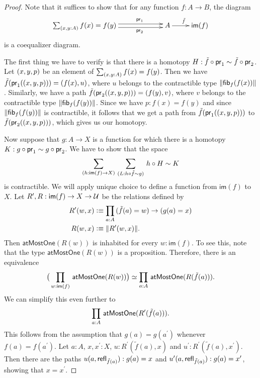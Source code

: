 \begin{proof}
Note that it suffices to show that for any function $f:A\to B$, the diagram
\begin{equation*}
  \xymatrix{
    **[l]{\sm{x,y:A} f(x)= f(y)}
    \ar@<0.25em>[r]^{\proj1}
    \ar@<-0.25em>[r]_{\proj2}
    &
    {A}
    \ar[r]^{\tilde{f}}
    &
    {\im(f)}
  }
\end{equation*}
is a coequalizer diagram.

The first thing we have to verify is that there is a homotopy 
$H:\tilde{f}\circ\mathsf{pr}_{1}\sim\tilde{f}\circ\mathsf{pr}_{2}$. Let ${(x,y,p)}$ be an element
of $\sm{x,y:A} f(x)= f(y)$. 
Then we have $\tilde{f}(\mathsf{pr}_{1}({(x,y,p)}))= {(f(x),u)}$, 
where $u$ belongs to the contractible type $\|{\mathsf{fib}}_{f}(f(x))\|$. 
Similarly, we have a path 
$\tilde{f}(\mathsf{pr}_{2}({(x,y,p)}))= {(f(y),v)}$,
where $v$ belongs to the contractible type $\|{\mathsf{fib}}_{f}(f(y))\|$.
Since we have $p:f(x)= f(y)$ and since
$\|{\mathsf{fib}}_{f}(f(y))\|$ is contractible, 
it follows that we get a path from $\tilde{f}(\mathsf{pr}_{1}({(x,y,p)}))$ to
$\tilde{f}(\mathsf{pr}_{2}({(x,y,p)}))$, which gives us our homotopy.

Now suppose that $g:A\to X$ is a function for which there is a homotopy 
$K:g\circ\mathsf{pr}_{1}\sim g\circ\mathsf{pr}_{2}$. We have to show that the space
\begin{equation*}
\sm{h:\mathsf{im}(f)\to X}{L:h\circ\tilde{f}\sim g} h\circ H\sim K
\end{equation*}
is contractible. We will apply unique choice to define a 
function from $\mathsf{im}(f)$ to $X$. Let $R',R:\mathsf{im}(f)\to
X\to\mathcal{U}$ be the relations defined by 
\begin{align*}
R'(w,x) & \defeq\prd{a:A} (\tilde{f}(a)= w)\to (g(a)= x)\\
R(w,x) & \defeq \|R'(w,x)\|.
\end{align*}
Then $\mathsf{atMostOne}(R(w))$ is inhabited for every $w:\mathsf{im}(f)$. 
To see this, note that the type $\mathsf{atMostOne}(R(w))$ is a
proposition. Therefore, there is an equivalence
\begin{equation*}
\big(\prd{w:\mathsf{im}(f)} \mathsf{atMostOne}(R(w))\big)
\simeq\prd{a:A} \mathsf{atMostOne}(R(\tilde{f}(a))).
\end{equation*}
We can simplify this even further to
\begin{equation*}
\prd{a:A} \mathsf{atMostOne}(R^\prime(\tilde{f}(a))).
\end{equation*}
This follows from the assumption that $g(a)= g(a^\prime)$ 
whenever $f(a)= f(a^\prime)$. Let $a:A$, $x,x^\prime:X$,
$u:R^\prime(\tilde{f}(a),x)$ and $u^\prime:R^\prime(\tilde{f}(a),x^\prime)$. 
Then there are the paths $u(a,\mathsf{refl}_{\tilde{f}(a)}):g(a)=
x$ and $u^\prime(a,\mathsf{refl}_{\tilde{f}(a)}):g(a)= x^\prime$, 
showing that $x= x^\prime$. 


\end{proof}
